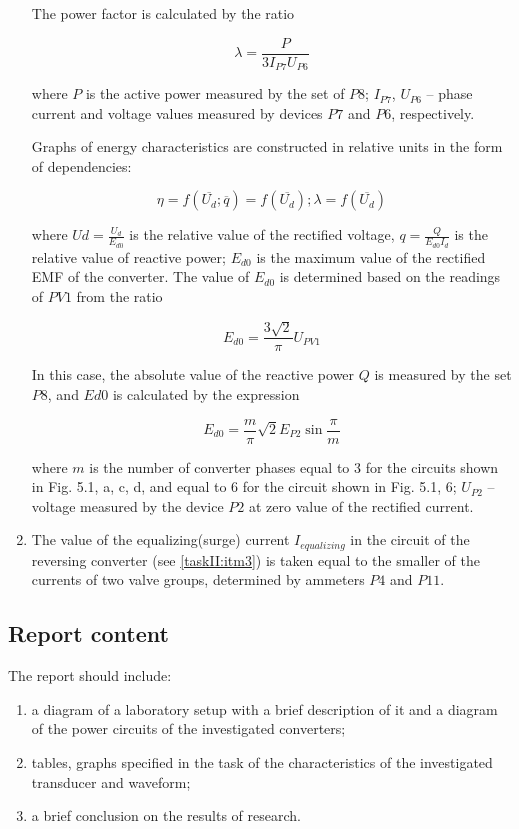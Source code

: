 \documentclass[a4paper,14pt]{article}
\begin{document}
\begin{enumerate}[label=\emph{\arabic*}. , ref=\emph{\thesubsection.\arabic*}, leftmargin=0pt, labelindent=\parindent]
\begin{itemize}
\end{itemize}


The power factor is calculated by the ratio

$$
\lambda = \frac{P}{3I_{P7}U_{P6}}
$$

where $P$ is the active power measured by the set of $P8$; $I_{P7}$, $U_{P6}$ -- phase current and 
voltage values measured by devices $P7$ and $P6$, respectively.

Graphs of energy characteristics are constructed in relative units in the form of dependencies:

$$
                \eta = f(\overline{U_d}; \overline{q}) = f(\overline{U_d}); \lambda = f(\overline{U_d})
$$

where ${\displaystyle Ud = \frac{U_d}{E_{d0}}}$ is the relative value of the rectified voltage,
${\displaystyle q = \frac{Q}{E_{d0}I_d}}$ is the relative value of reactive power; $E_{d0}$
is the maximum value of the rectified EMF of the converter.
The value of $E_{d0}$ is determined based on the readings of $PV1$ from the ratio

$$
E_{d0} = \frac{3\sqrt{2}}{\pi} U_{PV1}
$$


In this case, the absolute value of the reactive power $Q$ is measured by the set $P8$, 
and $Ed0$ is calculated by the expression

$$
E_{d0} = \frac{m}{\pi} \sqrt{2} E_{P2} \sin\frac{\pi}{m}
$$

where $m$ is the number of converter phases equal to 3 for the circuits shown in Fig. 5.1, a, c, d, 
and equal to 6 for the circuit shown in Fig. 5.1, 6; $U_{P2}$ -- voltage measured by the device $P2$ 
at zero value of the rectified current.

\item The value of the equalizing(surge) current $I_{equalizing}$ in the circuit of the reversing converter 
(see \ref{taskII:itm3}) is taken equal to the smaller of the currents of two valve groups, 
determined by ammeters $P4$ and $P11$.

\end{enumerate}

\subsection{Report content}

The report should include:

\begin{enumerate}
\item a diagram of a laboratory setup with a brief description of it and a diagram of the power circuits of the investigated converters;

\item tables, graphs specified in the task of the characteristics of the investigated transducer and waveform;

\item a brief conclusion on the results of research.
\end{enumerate}
\end{document}
